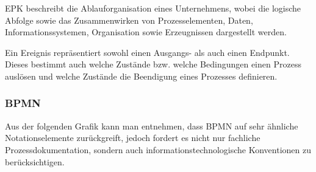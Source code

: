 EPK beschreibt die Ablauforganisation eines Unternehmens, wobei die logische
Abfolge sowie das Zusammenwirken von Prozesselementen, Daten,
Informationssystemen, Organisation sowie Erzeugnissen dargestellt werden.

\begin{figure}[H]
\begin{minipage}{\linewidth}
\begin{center}
\end{center}
\end{minipage}
\end{figure}


Ein Ereignis repräsentiert sowohl einen Ausgangs- als auch einen Endpunkt.
Dieses bestimmt auch welche Zustände bzw. welche Bedingungen einen Prozess
auslösen und welche Zustände die Beendigung eines Prozesses definieren.

\subsubsection{BPMN}

Aus der folgenden Grafik kann man entnehmen, dass BPMN auf sehr ähnliche
Notationselemente zurückgreift, jedoch fordert es nicht nur
fachliche Prozessdokumentation, sondern auch informationstechnologische
Konventionen zu berücksichtigen.

\begin{figure}[H]
\begin{minipage}{\linewidth}
\begin{center}
\end{center}
\end{minipage}
\end{figure}

